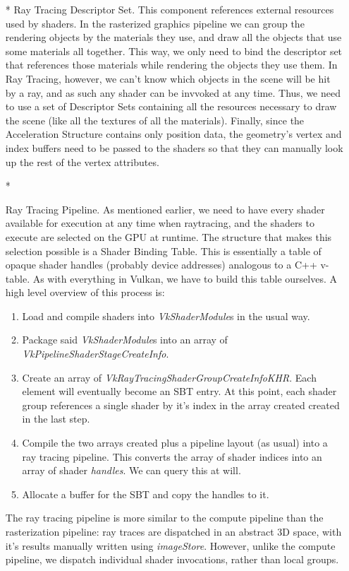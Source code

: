 \begin{itemize}
  \item[*] {Ray Tracing Descriptor Set. This component references external resources used by shaders. In the rasterized graphics pipeline we can group the rendering objects by the materials they use, and draw all the objects that use some materials all together. This way, we only need to bind the descriptor set that references those materials while rendering the objects they use them. In Ray Tracing, however, we can't know which objects in the scene will be hit by a ray, and as such any shader can be invvoked at any time. Thus, we need to use a set of Descriptor Sets containing all the resources necessary to draw the scene (like all the textures of all the materials). Finally, since the Acceleration Structure contains only position data, the geometry's vertex and index buffers need to be passed to the shaders so that they can manually look up the rest of the vertex attributes.}
  \item[*]{Ray Tracing Pipeline. As mentioned earlier, we need to have every shader available for execution at any time when raytracing, and the shaders to execute are selected on the GPU at runtime. The structure that makes this selection possible is a Shader Binding Table. This is essentially a table of opaque shader handles (probably device addresses) analogous to a C++ v-table. As with everything in Vulkan, we have to build this table ourselves. A high level overview of this process is:
    \begin{enumerate}
      \item Load and compile shaders into \textit{VkShaderModule}s in the usual way.
      \item Package said \textit{VkShaderModule}s into an array of \textit{VkPipelineShaderStageCreateInfo}.
      \item Create an array of \textit{VkRayTracingShaderGroupCreateInfoKHR}. Each element will eventually become an SBT entry. At this point, each shader group references a single shader by it's index in the array created created in the last step.
      \item Compile the two arrays created plus a pipeline layout (as usual) into a ray tracing pipeline. This converts the array of shader indices into an array of shader \textit{handles}. We can query this at will.
      \item Allocate a buffer for the SBT and copy the handles to it.
    \end{enumerate}
    The ray tracing pipeline is more similar to the compute pipeline than the rasterization pipeline: ray traces are dispatched in an abstract 3D space, with it's results manually written using \textit{imageStore}. However, unlike the compute pipeline, we dispatch individual shader invocations, rather than local groups.

}
\end{itemize}
